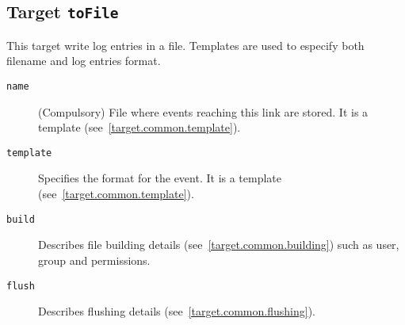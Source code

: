 \subsection{Target {\tt toFile}}
This target write log entries in a file.
Templates are used to especify both filename and log entries format.
%
\begin{description}
  \item[{\tt name}] (Compulsory)
    File where events reaching this link are stored.
    It is a template (see~\ref{target.common.template}).
    
  \item[{\tt template}]
    Specifies the format for the event.
    It is a template (see~\ref{target.common.template}).
    
  \item[{\tt build}]
    Describes file building details (see~\ref{target.common.building})
    such as user, group and permissions.
    
  \item[{\tt flush}]
    Describes flushing details (see~\ref{target.common.flushing}).
\end{description}
%
